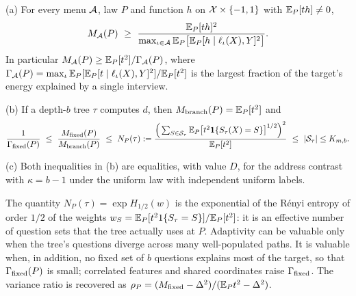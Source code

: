 \begin{theorem}\label{thm:bracketfull}
\textup{(a)} For every menu $\mathcal A$, law $P$ and function $h$ on
$\mathcal X\times\{-1,1\}$ with $\mathbb{E}_P[th]\ne0$,
\[
 M_\A(P)\ \ge\ \frac{\E_P[th]^2}{\max_{\iota\in\A}\E_P\big[\E_P[h\mid\ell_\iota(X),Y]^2\big]}.
\]
In particular $M_\mathcal A(P)\ge\mathbb{E}_P[t^2]/\Gamma_\mathcal A(P)$, where
$\Gamma_\mathcal A(P)=\max_\iota\mathbb{E}_P[\mathbb{E}_P[t\mid\ell_\iota(X),Y]^2]/\mathbb{E}_P[t^2]$ is the
largest fraction of the target's energy explained by a single interview.

\textup{(b)} If a depth-$b$ tree $\tau$ computes $d$, then
$M_{\rm branch}(P)=\mathbb{E}_P[t^2]$ and
\[
 \frac1{\Gamma_{\rm fixed}(P)}
 \ \le\ \frac{M_{\rm fixed}(P)}{M_{\rm branch}(P)}
 \ \le\ N_P(\tau):=\frac{\Big(\sum_{S\in\mathcal S_\tau}\mathbb{E}_P\big[t^2\mathbf 1\{S_\tau(X)=S\}\big]^{1/2}\Big)^2}{\mathbb{E}_P[t^2]}
 \ \le\ |\mathcal S_\tau|\le K_{m,b}.
\]

\textup{(c)} Both inequalities in (b) are equalities, with value $D$, for the
address contrast with $\kappa=b-1$ under the uniform law with independent
uniform labels.
\end{theorem}

The quantity $N_P(\tau)=\exp H_{1/2}(w)$ is the exponential of the R\'enyi
entropy of order $1/2$ of the weights
$w_S=\mathbb{E}_P[t^21\{S_\tau=S\}]/\mathbb{E}_P[t^2]$: it is an effective number of
question sets that the tree actually uses at $P$. Adaptivity can be valuable
only when the tree's questions diverge across many well-populated paths. It
is valuable when, in addition, no fixed set of $b$ questions explains most of
the target, so that $\Gamma_{\rm fixed}(P)$ is small; correlated features and
shared coordinates raise $\Gamma_{\rm fixed}$. The variance ratio is
recovered as $\rho_P=(M_{\rm fixed}-\Delta^2)/(\mathbb{E}_Pt^2-\Delta^2)$.


